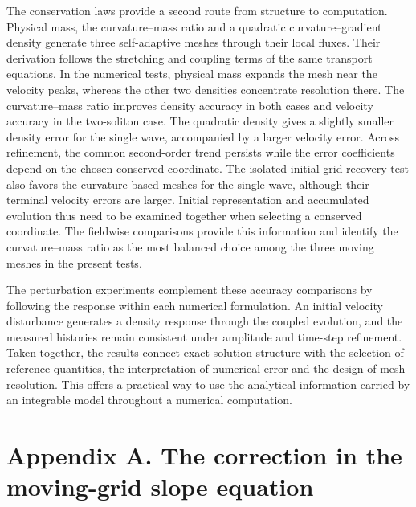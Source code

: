\documentclass[11pt,a4paper]{article}
\begin{document}
The conservation laws provide a second route from structure to computation. Physical mass, the curvature--mass ratio and a quadratic curvature--gradient density generate three self-adaptive meshes through their local fluxes. Their derivation follows the stretching and coupling terms of the same transport equations. In the numerical tests, physical mass expands the mesh near the velocity peaks, whereas the other two densities concentrate resolution there. The curvature--mass ratio improves density accuracy in both cases and velocity accuracy in the two-soliton case. The quadratic density gives a slightly smaller density error for the single wave, accompanied by a larger velocity error. Across refinement, the common second-order trend persists while the error coefficients depend on the chosen conserved coordinate. The isolated initial-grid recovery test also favors the curvature-based meshes for the single wave, although their terminal velocity errors are larger. Initial representation and accumulated evolution thus need to be examined together when selecting a conserved coordinate. The fieldwise comparisons provide this information and identify the curvature--mass ratio as the most balanced choice among the three moving meshes in the present tests.

The perturbation experiments complement these accuracy comparisons by following the response within each numerical formulation. An initial velocity disturbance generates a density response through the coupled evolution, and the measured histories remain consistent under amplitude and time-step refinement. Taken together, the results connect exact solution structure with the selection of reference quantities, the interpretation of numerical error and the design of mesh resolution. This offers a practical way to use the analytical information carried by an integrable model throughout a numerical computation.

\FloatBarrier
\section*{Appendix A. The correction in the moving-grid slope equation}
\label{app:correction}
\end{document}
